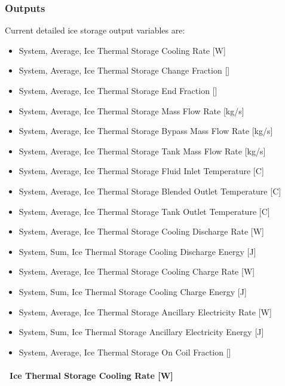 \subsubsection{Outputs}\label{outputs-19-000}

Current detailed ice storage output variables are:

\begin{itemize}
\item
  System, Average, Ice Thermal Storage Cooling Rate {[}W{]}
\item
  System, Average, Ice Thermal Storage Change Fraction {[]}
\item
  System, Average, Ice Thermal Storage End Fraction {[]}
\item
  System, Average, Ice Thermal Storage Mass Flow Rate {[}kg/s{]}
\item
  System, Average, Ice Thermal Storage Bypass Mass Flow Rate {[}kg/s{]}
\item
  System, Average, Ice Thermal Storage Tank Mass Flow Rate {[}kg/s{]}
\item
  System, Average, Ice Thermal Storage Fluid Inlet Temperature {[}C{]}
\item
  System, Average, Ice Thermal Storage Blended Outlet Temperature {[}C{]}
\item
  System, Average, Ice Thermal Storage Tank Outlet Temperature {[}C{]}
\item
  System, Average, Ice Thermal Storage Cooling Discharge Rate {[}W{]}
\item
  System, Sum, Ice Thermal Storage Cooling Discharge Energy {[}J{]}
\item
  System, Average, Ice Thermal Storage Cooling Charge Rate {[}W{]}
\item
  System, Sum, Ice Thermal Storage Cooling Charge Energy {[}J{]}
\item
  System, Average, Ice Thermal Storage Ancillary Electricity Rate {[}W{]}
\item
  System, Sum, Ice Thermal Storage Ancillary Electricity Energy {[}J{]}
\item
  System, Average, Ice Thermal Storage On Coil Fraction {[]}
\end{itemize}

\paragraph{~Ice Thermal Storage Cooling Rate {[}W{]}}\label{ice-thermal-storage-cooling-rate-w}

